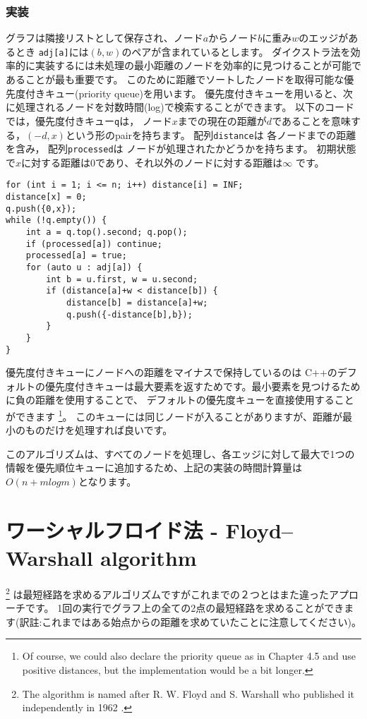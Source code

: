 \subsubsection{実装}

グラフは隣接リストとして保存され、ノード$a$からノード$b$に重み$w$のエッジがあるとき
\texttt{adj[a]}には$(b, w)$のペアが含まれているとします。
ダイクストラ法を効率的に実装するには未処理の最小距離のノードを効率的に見つけることが可能であることが最も重要です。
このために距離でソートしたノードを取得可能な優先度付きキュー(priority queue)を用います。
優先度付きキューを用いると、次に処理されるノードを対数時間(log)で検索することができます。
以下のコードでは，優先度付きキュー\texttt{q}は，
ノード$x$までの現在の距離が$d$であることを意味する，$(-d, x)$という形のpairを持ちます。
配列\texttt{distance}は
各ノードまでの距離を含み，
配列\texttt{processed}は
ノードが処理されたかどうかを持ちます。
初期状態で$x$に対する距離は0であり、それ以外のノードに対する距離は$\infty$ です。
\begin{lstlisting}
for (int i = 1; i <= n; i++) distance[i] = INF;
distance[x] = 0;
q.push({0,x});
while (!q.empty()) {
    int a = q.top().second; q.pop();
    if (processed[a]) continue;
    processed[a] = true;
    for (auto u : adj[a]) {
        int b = u.first, w = u.second;
        if (distance[a]+w < distance[b]) {
            distance[b] = distance[a]+w;
            q.push({-distance[b],b});
        }
    }
}
\end{lstlisting}


優先度付きキューにノードへの距離をマイナスで保持しているのは
C++のデフォルトの優先度付きキューは最大要素を返すためです。最小要素を見つけるために負の距離を使用することで、
デフォルトの優先度キューを直接使用することができます
\footnote{Of
course, we could also declare the priority queue as in Chapter 4.5
and use positive distances, but the implementation would be a bit longer.}。
このキューには同じノードが入ることがありますが、距離が最小のものだけを処理すれば良いです。

このアルゴリズムは、すべてのノードを処理し、各エッジに対して最大で1つの情報を優先順位キューに追加するため、上記の実装の時間計算量は$O(n + m log m)$となります。

\section{ワーシャルフロイド法 - Floyd–Warshall algorithm}


\footnote{The algorithm
is named after R. W. Floyd and S. Warshall
who published it independently in 1962 \cite{flo62,war62}.}
は最短経路を求めるアルゴリズムですがこれまでの２つとはまた違ったアプローチです。
1回の実行でグラフ上の全ての2点の最短経路を求めることができます(訳註:これまではある始点からの距離を求めていたことに注意してください)。

